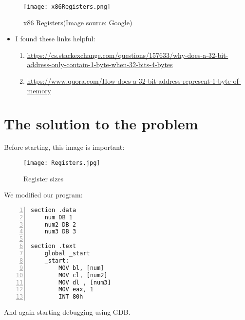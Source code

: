 \documentclass{article}
\makeatletter
\renewcommand\paragraph{\@startsection{paragraph}{4}{\z@}{-3.25ex \@plus -1ex \@minus -.2ex}{1.5ex \@plus .2ex}{\normalfont\normalsize\bfseries}}
\makeatother
\begin{document}
\begin{figure}[h]
\centering
\texttt{[image: x86Registers.png]}
\caption{x86 Registers(Image source: \href{https://www.google.com/}{Google})}
\label{fig:x86}
\end{figure}

\newpage
\begin{itemize}
\item I found these links helpful:
\begin{enumerate}[label=$\bullet$]
\item \href{https://cs.stackexchange.com/questions/157633/why-does-a-32-bit-address-only-contain-1-byte-when-32-bits-4-bytes}{https://cs.stackexchange.com/questions/157633/why-does-a-32-bit-address-only-contain-1-byte-when-32-bits-4-bytes}
\item \href{https://www.quora.com/How-does-a-32-bit-address-represent-1-byte-of-memory}{https://www.quora.com/How-does-a-32-bit-address-represent-1-byte-of-memory}
\end{enumerate}
\end{itemize}

\section{The solution to the problem}\label{sec:solution}
\paragraph{}
Before starting, this image is important:

\begin{figure}[h]
\centering
\texttt{[image: Registers.jpg]}
\caption{Register sizes}
\label{fig:registerSize}
\end{figure}

We modified our program:

\begin{Verbatim}[numbers=left, frame=single]
section .data
	num DB 1
	num2 DB 2
	num3 DB 3
	
section .text
	global _start
	_start:
		MOV bl, [num]
		MOV cl, [num2]
		MOV dl , [num3]
		MOV eax, 1
		INT 80h
\end{Verbatim}
And again starting debugging using GDB.

\noindent
{}
\end{document}
